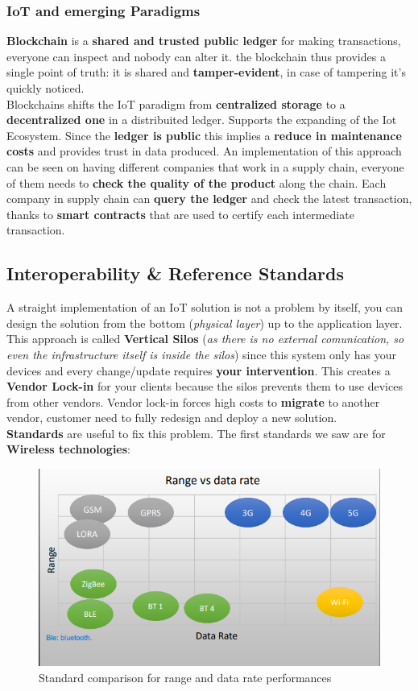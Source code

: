 \documentclass[10pt,a4paper]{report}
\theoremstyle{definition}
\begin{document}
\subsubsection{IoT and emerging Paradigms}\label{sec:iot-and-emerging-paradigms}
\textbf{Blockchain} is a \textbf{shared and trusted public ledger} for making transactions, everyone can inspect and nobody can alter it. the blockchain thus provides a single point of truth: it is shared and \textbf{tamper-evident}, in case of tampering it's quickly noticed.\\
Blockchains shifts the IoT paradigm from \textbf{centralized storage} to a \textbf{decentralized one} in a distribuited ledger. Supports the expanding of the Iot Ecosystem. Since the \textbf{ledger is public} this implies a \textbf{reduce in maintenance costs} and provides trust in data produced. An implementation of this approach can be seen on having different companies that work in a supply chain, everyone of them needs to \textbf{check the quality of the product} along the chain. Each company in supply chain can \textbf{query the ledger} and check the latest transaction, thanks to \textbf{smart contracts} that are used to certify each intermediate transaction.
\subsection{Interoperability \& Reference Standards}\label{sec:interoperability--reference-standards}
A straight implementation of an IoT solution is not a problem by itself, you can design the solution from the bottom (\textit{physical layer}) up to the application layer. This approach is called \textbf{Vertical Silos} (\textit{as there is no external comunication, so even the infrastructure itself is inside the \textit{silos}}) since this system only has your devices and every change/update requires \textbf{your intervention}. This creates a \textbf{Vendor Lock-in} for your clients because the silos prevents them to use devices from other vendors. Vendor lock-in forces high costs to \textbf{migrate} to another vendor, customer need to fully redesign and deploy a new solution.\\
\textbf{Standards} are useful to fix this problem. The first standards we saw are for \textbf{Wireless technologies}:
\begin{figure}[h]
	\centering
	\includegraphics[scale=0.50]{images/Pasted image 20230223102134.png}
	\caption{Standard comparison for range and data rate performances}
\end{figure}
\end{document}
